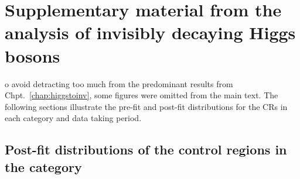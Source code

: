 \chapter{Supplementary material from the analysis of invisibly decaying Higgs bosons}
\label{app:supplementary_hinv_plots}

o avoid detracting too much from the predominant results from Chpt.~\ref{chap:higgstoinv}, some figures were omitted from the main text. The following sections illustrate the pre-fit and post-fit distributions for the \glspl{CR} in each category and data taking period.




\section{Post-fit distributions of the control regions in the \texorpdfstring{\ttH}{ttH} category}
\label{sec:pre_post_fit_plots_ttH_CRs}

